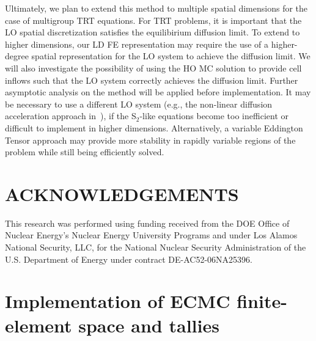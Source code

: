 \documentclass{mc2013}
\begin{document}
Ultimately, we plan to extend this method to multiple spatial dimensions for the 
case of multigroup TRT equations.  For TRT problems, it is important that
the LO spatial discretization satisfies the equilibirium diffusion limit.  To extend
to higher dimensions, our LD FE representation may require the use of a higher-degree
spatial representation for the LO system to achieve the diffusion
limit.  We will also
investigate the possibility of using the HO MC solution to provide cell inflows such
that the LO system correctly achieves the diffusion
limit.  Further asymptotic
analysis on the method will be applied before implementation.    It may be necessary to use a different LO system (e.g., the non-linear diffusion
acceleration approach in~\cite{rmc}), if the S$_2$-like equations become too
inefficient or difficult to implement in higher dimensions.  Alternatively, a
variable Eddington Tensor approach may provide more stability in rapidly variable
regions of the problem while still being
efficiently solved.

\section*{ACKNOWLEDGEMENTS}

This research was performed using funding received from the DOE Office of Nuclear
Energy's Nuclear Energy University Programs and under Los Alamos National Security,
LLC, for the National Nuclear Security Administration of the U.S. Department of
Energy under contract DE-AC52-06NA25396. 


\setlength{\baselineskip}{12pt}


\clearpage
\appendix

\section{Implementation of ECMC finite-element space and tallies}

\label{app:tallies}
\end{document}
